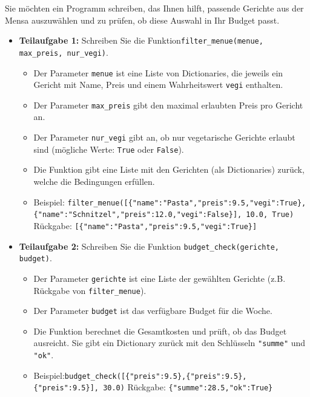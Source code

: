 \begin{myexercise}

	Sie möchten ein Programm schreiben, das Ihnen hilft, passende Gerichte aus der Mensa auszuwählen und zu prüfen, ob diese Auswahl in Ihr Budget passt.

	\begin{itemize}
		\item \textbf{Teilaufgabe 1:} Schreiben Sie die Funktion\newline \lstinline{filter_menue(menue, max_preis, nur_vegi)}.
		      \begin{itemize}
			      \item Der Parameter \lstinline{menue} ist eine Liste von Dictionaries, die jeweils ein Gericht mit Name, Preis und einem Wahrheitswert \lstinline{vegi} enthalten.
			      \item Der Parameter \lstinline{max_preis} gibt den maximal erlaubten Preis pro Gericht an.
			      \item Der Parameter \lstinline{nur_vegi} gibt an, ob nur vegetarische Gerichte erlaubt sind (mögliche Werte: \lstinline{True} oder \lstinline{False}).
			      \item Die Funktion gibt eine Liste mit den Gerichten (als Dictionaries) zurück, welche die Bedingungen erfüllen.
			      \item Beispiel: \lstinline|filter_menue([{"name":"Pasta","preis":9.5,"vegi":True},{"name":"Schnitzel","preis":12.0,"vegi":False}], 10.0, True)|
			            \newline Rückgabe: \lstinline|[{"name":"Pasta","preis":9.5,"vegi":True}]|
		      \end{itemize}

		\item \textbf{Teilaufgabe 2:} Schreiben Sie die Funktion \lstinline{budget_check(gerichte, budget)}.
		      \begin{itemize}
			      \item Der Parameter \lstinline{gerichte} ist eine Liste der gewählten Gerichte (z.B. Rückgabe von \lstinline{filter_menue}).
			      \item Der Parameter \lstinline{budget} ist das verfügbare Budget für die Woche.
			      \item Die Funktion berechnet die Gesamtkosten und prüft, ob das Budget ausreicht. Sie gibt ein Dictionary zurück mit den Schlüsseln \lstinline{"summe"} und \lstinline{"ok"}.
			      \item Beispiel:\newline \lstinline|budget_check([{"preis":9.5},{"preis":9.5},{"preis":9.5}], 30.0)|
			            \newline Rückgabe: \lstinline|{"summe":28.5,"ok":True}|
		      \end{itemize}
	\end{itemize}


\end{myexercise}
